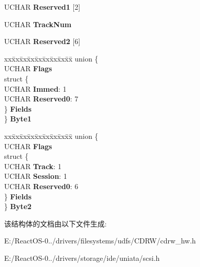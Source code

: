 \begin{DoxyCompactItemize}
\begin{tabbing}
\end{tabbing}\item 
\mbox{\label{struct___c_d_b_1_1___c_l_o_s_e___t_r_a_c_k___s_e_s_s_i_o_n_ae3e5861400ad67cd915f91d311235d22}} 
U\+C\+H\+AR {\bfseries Reserved1} \mbox{[}2\mbox{]}
\item 
\mbox{\label{struct___c_d_b_1_1___c_l_o_s_e___t_r_a_c_k___s_e_s_s_i_o_n_a65f4753bdbc45afdc0fbebcf0ea1c53c}} 
U\+C\+H\+AR {\bfseries Track\+Num}
\item 
\mbox{\label{struct___c_d_b_1_1___c_l_o_s_e___t_r_a_c_k___s_e_s_s_i_o_n_a5e14d9618a62b12365a6f5cf5606ce49}} 
U\+C\+H\+AR {\bfseries Reserved2} \mbox{[}6\mbox{]}
\item 
\mbox{\label{struct___c_d_b_1_1___c_l_o_s_e___t_r_a_c_k___s_e_s_s_i_o_n_acd2c518e53bd848889bceb4759f3967c}} 
\begin{tabbing}
xx\=xx\=xx\=xx\=xx\=xx\=xx\=xx\=xx\=\kill
union \{\\
\>UCHAR {\bfseries Flags}\\
\>struct \{\\
\>\>UCHAR {\bfseries Immed}: 1\\
\>\>UCHAR {\bfseries Reserved0}: 7\\
\>\} {\bfseries Fields}\\
\} {\bfseries Byte1}\\

\end{tabbing}\item 
\mbox{\label{struct___c_d_b_1_1___c_l_o_s_e___t_r_a_c_k___s_e_s_s_i_o_n_af5d4aab14fd01e725d91826af686b97a}} 
\begin{tabbing}
xx\=xx\=xx\=xx\=xx\=xx\=xx\=xx\=xx\=\kill
union \{\\
\>UCHAR {\bfseries Flags}\\
\>struct \{\\
\>\>UCHAR {\bfseries Track}: 1\\
\>\>UCHAR {\bfseries Session}: 1\\
\>\>UCHAR {\bfseries Reserved0}: 6\\
\>\} {\bfseries Fields}\\
\} {\bfseries Byte2}\\

\end{tabbing}\end{DoxyCompactItemize}


该结构体的文档由以下文件生成\+:\begin{DoxyCompactItemize}
\item 
E\+:/\+React\+O\+S-\/0../drivers/filesystems/udfs/\+C\+D\+R\+W/cdrw\+\_\+hw.\+h\item 
E\+:/\+React\+O\+S-\/0../drivers/storage/ide/uniata/scsi.\+h\end{DoxyCompactItemize}
